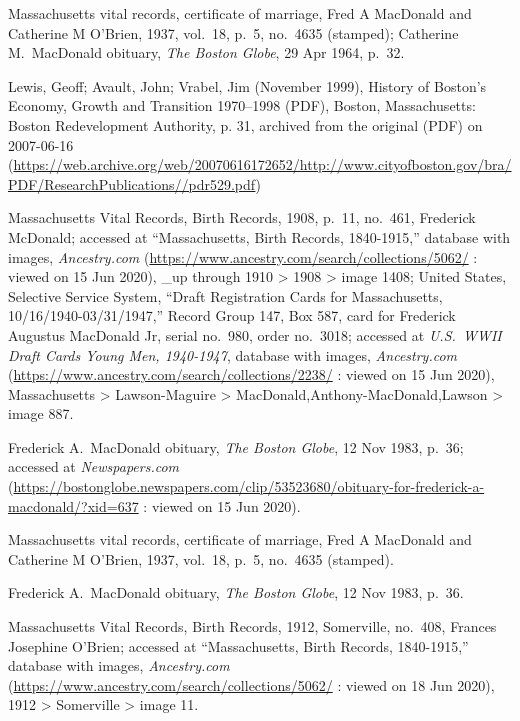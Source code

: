 \begin{thebibliography}{999}
Massachusetts vital records, certificate of marriage, Fred A MacDonald and Catherine M O'Brien, 1937, vol.\ 18, p.\ 5, no.\ 4635 (stamped); Catherine M.\ MacDonald obituary, \textit{The Boston Globe}, 29 Apr 1964, p.\ 32.

Lewis, Geoff; Avault, John; Vrabel, Jim (November 1999), History of Boston's Economy, Growth and Transition 1970–1998 (PDF), Boston, Massachusetts: Boston Redevelopment Authority, p. 31, archived from the original (PDF) on 2007-06-16 (\url{https://web.archive.org/web/20070616172652/http://www.cityofboston.gov/bra/PDF/ResearchPublications//pdr529.pdf})

Massachusetts Vital Records, Birth Records, 1908, p.\ 11, no.\ 461, Frederick McDonald; accessed at ``Massachusetts, Birth Records, 1840-1915,'' database with images, \textit{Ancestry.com} (\url{https://www.ancestry.com/search/collections/5062/} : viewed on 15 Jun 2020), \_up through 1910 > 1908 > image 1408; United States, Selective Service System, ``Draft Registration Cards for Massachusetts, 10/16/1940-03/31/1947,'' Record Group 147, Box 587, card for Frederick Augustus MacDonald Jr, serial no.\ 980, order no.\ 3018; accessed at \textit{U.S.\ WWII Draft Cards Young Men, 1940-1947}, database with images, \textit{Ancestry.com} (\url{https://www.ancestry.com/search/collections/2238/} : viewed on 15 Jun 2020), Massachusetts > Lawson-Maguire > MacDonald,Anthony-MacDonald,Lawson > image 887.

Frederick A.\ MacDonald obituary, \textit{The Boston Globe}, 12 Nov 1983, p.\ 36; accessed at \textit{Newspapers.com} (\url{https://bostonglobe.newspapers.com/clip/53523680/obituary-for-frederick-a-macdonald/?xid=637} : viewed on 15 Jun 2020).

Massachusetts vital records, certificate of marriage, Fred A MacDonald and Catherine M O'Brien, 1937, vol.\ 18, p.\ 5, no.\ 4635 (stamped).

Frederick A.\ MacDonald obituary, \textit{The Boston Globe}, 12 Nov 1983, p.\ 36.


Massachusetts Vital Records, Birth Records, 1912, Somerville, no.\ 408, Frances Josephine O'Brien; accessed at ``Massachusetts, Birth Records, 1840-1915,'' database with images, \textit{Ancestry.com} (\url{https://www.ancestry.com/search/collections/5062/} : viewed on 18 Jun 2020), 1912 > Somerville > image 11.


\end{thebibliography}
